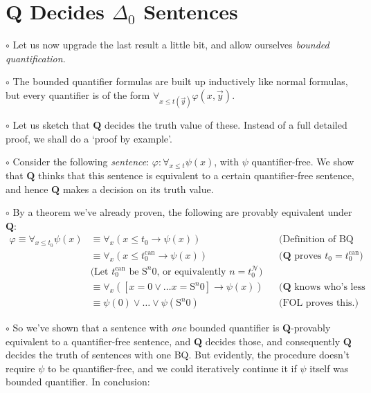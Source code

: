 \documentclass{article}
\newcommand{\RQ}{\mathbf{Q}}
\newcommand{\TN}{\mathcal{N}}
\newcommand{\suc}{\mathrm{S}}
\newcommand{\can}{\mathrm{can}}
\newcommand\point[1]{\noindent \hspace{\labelsep} {\small $\circ$ #1} \smallskip}
\newcommand\timestamp[1]{}
\begin{document}
\timestamp{43 min}

\section{$\RQ$ Decides $\Delta_0$ Sentences}

\point{Let us now upgrade the last result a little bit, and allow ourselves \emph{bounded quantification}.}

\point{The bounded quantifier formulas are built up inductively like normal formulas, but every quantifier is of the form $\forall_{x \leq t(\vec y)} \varphi(x, \vec y)$.}

\point{Let us sketch that $\RQ$ decides the truth value of these. Instead of a full detailed proof, we shall do a `proof by example'.}

\point{Consider the following \emph{sentence}: $\varphi \colon \forall_{x \leq t} \psi(x)$, with $\psi$ quantifier-free. We show that $\RQ$ thinks that this sentence is equivalent to a certain quantifier-free sentence, and hence $\RQ$ makes a decision on its truth value.}

\point{By a theorem we've already proven, the following are provably equivalent under $\RQ$:
\begin{equation}
\begin{aligned}
\varphi \equiv \forall_{x \leq t_0} \psi(x) &\equiv \forall_x (x \leq t_0 \rightarrow \psi(x)) && \text{(Definition of BQ by abbreviation)}\\
&\equiv \forall_x(x \leq t_0^\can \rightarrow \psi(x)) &&\text{($\RQ$ proves $t_0 = t_0^\can$)}\\
&\text{(Let $t_0^\can$ be $\suc^n 0$, or equivalently $n = t_0^\TN$)}\\
&\equiv \forall_x( [x = 0 \lor \dots x = \suc^n 0] \rightarrow \psi(x) )&& \text{($\RQ$ knows who's less than each natural number)}\\
&\equiv \psi(0) \lor \dots \lor \psi(\suc^n 0) &&\text{(FOL proves this.)}
\end{aligned}
\end{equation}}

\point{So we've shown that a sentence with \emph{one} bounded quantifier is $\RQ$-provably equivalent to a quantifier-free sentence, and $\RQ$ decides those, and consequently $\RQ$ decides the truth of sentences with one BQ. But evidently, the procedure doesn't require $\psi$ to be quantifier-free, and we could iteratively continue it if $\psi$ itself was bounded quantifier. In conclusion:}
\end{document}
